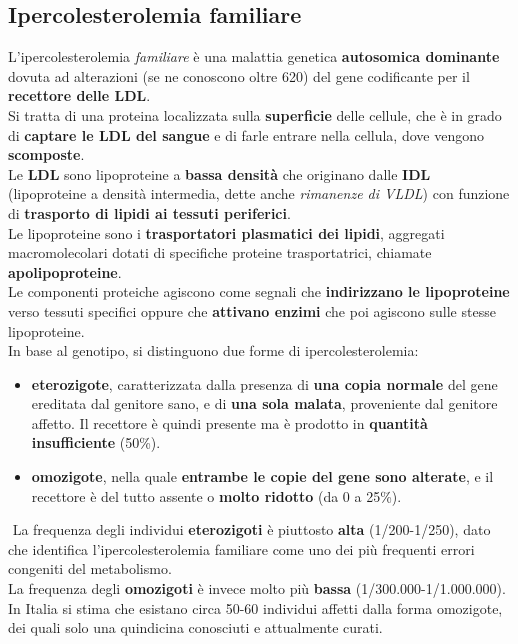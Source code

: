 \documentclass[a4paper, 12pt]{article}
\begin{document}
\begin{titlepage}
\subsection{Ipercolesterolemia familiare}
L’ipercolesterolemia \textit{familiare} è una malattia genetica \textbf{autosomica dominante} dovuta ad alterazioni (se ne conoscono oltre 620) del gene codificante per il \textbf{recettore delle LDL}.\\
Si tratta di una proteina localizzata sulla \textbf{superficie} delle cellule, che è in grado di \textbf{captare le LDL del sangue} e di farle entrare nella cellula, dove vengono \textbf{scomposte}.\\
Le \textbf{LDL} sono lipoproteine a \textbf{bassa densità} che originano dalle \textbf{IDL} (lipoproteine a densità intermedia, dette anche \textit{rimanenze di VLDL}) con funzione di \textbf{trasporto di lipidi ai tessuti periferici}.\\
Le lipoproteine sono i \textbf{trasportatori plasmatici dei lipidi}, aggregati macromolecolari dotati di specifiche proteine trasportatrici, chiamate \textbf{apolipoproteine}.\\ Le componenti proteiche agiscono come segnali che \textbf{indirizzano le lipoproteine} verso tessuti specifici oppure che \textbf{attivano enzimi} che poi agiscono sulle stesse lipoproteine.\\
In base al genotipo, si distinguono due forme di ipercolesterolemia:
\begin{itemize}
\item \textbf{eterozigote}, caratterizzata dalla presenza di \textbf{una copia normale} del gene ereditata dal genitore sano, e di \textbf{una sola malata}, proveniente dal genitore affetto. Il recettore è quindi presente ma è prodotto in \textbf{quantità insufficiente} (50\%).
\item \textbf{omozigote}, nella quale \textbf{entrambe le copie del gene sono alterate}, e il recettore è del tutto assente o \textbf{molto ridotto} (da 0 a 25\%).
\end{itemize}
 La frequenza degli individui \textbf{eterozigoti} è piuttosto \textbf{alta} (1/200-1/250), dato che identifica l’ipercolesterolemia familiare come uno dei più frequenti errori congeniti del metabolismo. \\
La frequenza degli \textbf{omozigoti} è invece molto più \textbf{bassa} (1/300.000-1/1.000.000).\\
In Italia si stima che esistano circa 50-60 individui affetti dalla forma omozigote, dei quali solo una quindicina conosciuti e attualmente curati.


\end{titlepage}
\end{document}
